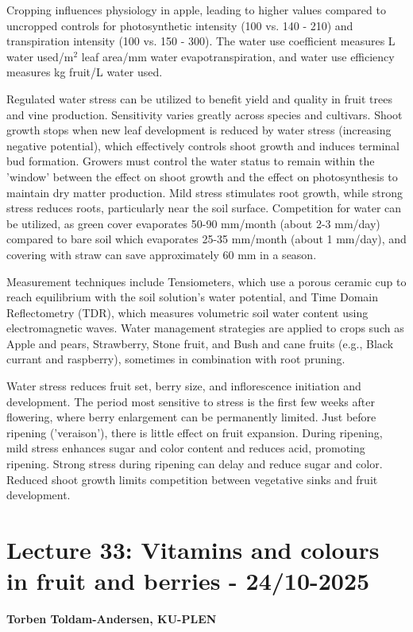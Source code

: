 \vspace{0.5em}
Cropping influences physiology in apple, leading to higher values compared to uncropped controls for photosynthetic intensity (100 vs. 140 - 210) and transpiration intensity (100 vs. 150 - 300). The water use coefficient measures L water used/m$^2$ leaf area/mm water evapotranspiration, and water use efficiency measures kg fruit/L water used.

\vspace{0.5em}
Regulated water stress can be utilized to benefit yield and quality in fruit trees and vine production. Sensitivity varies greatly across species and cultivars. Shoot growth stops when new leaf development is reduced by water stress (increasing negative potential), which effectively controls shoot growth and induces terminal bud formation. Growers must control the water status to remain within the 'window' between the effect on shoot growth and the effect on photosynthesis to maintain dry matter production. Mild stress stimulates root growth, while strong stress reduces roots, particularly near the soil surface. Competition for water can be utilized, as green cover evaporates 50-90 mm/month (about 2-3 mm/day) compared to bare soil which evaporates 25-35 mm/month (about 1 mm/day), and covering with straw can save approximately 60 mm in a season.

\vspace{0.5em}
Measurement techniques include Tensiometers, which use a porous ceramic cup to reach equilibrium with the soil solution's water potential, and Time Domain Reflectometry (TDR), which measures volumetric soil water content using electromagnetic waves. Water management strategies are applied to crops such as Apple and pears, Strawberry, Stone fruit, and Bush and cane fruits (e.g., Black currant and raspberry), sometimes in combination with root pruning.

\vspace{0.5em}
Water stress reduces fruit set, berry size, and inflorescence initiation and development. The period most sensitive to stress is the first few weeks after flowering, where berry enlargement can be permanently limited. Just before ripening ('veraison'), there is little effect on fruit expansion. During ripening, mild stress enhances sugar and color content and reduces acid, promoting ripening. Strong stress during ripening can delay and reduce sugar and color. Reduced shoot growth limits competition between vegetative sinks and fruit development.


\section{Lecture 33: Vitamins and colours in fruit and berries - 24/10-2025}
\textbf{Torben Toldam-Andersen, KU-PLEN}

